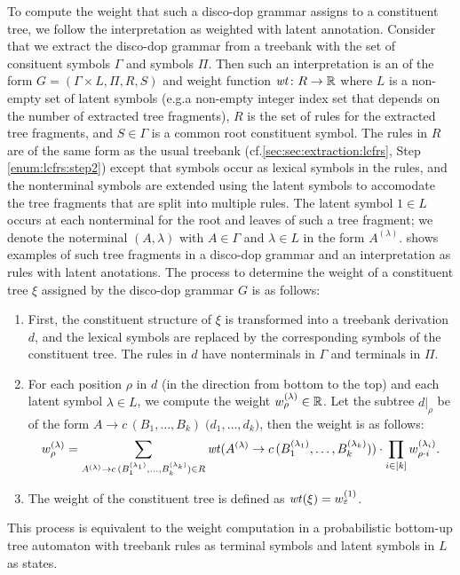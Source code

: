 \documentclass[../../document.tex]{subfiles}
\begin{document}
    To compute the weight that such a disco-dop grammar assigns to a constituent tree, we follow the interpretation as weighted  with latent annotation.
    Consider that we extract the disco-dop grammar from a treebank with the set of consituent symbols \(\varGamma\) and  symbols \(\varPi\).
    Then such an interpretation is an  of the form \(G = (\varGamma \times L, \varPi, R, S)\) and weight function \(\mathit{wt}\colon R \to \mathbb{R}\)  where \(L\) is a non-empty set of latent symbols (e.g.\@ a non-empty integer index set that depends on the number of extracted tree fragments), \(R\) is the set of rules for the extracted tree fragments, and \(S \in \varGamma\) is a common root constituent symbol.
    The rules in \(R\) are of the same form as the usual treebank  (cf.\@ \cref{sec:sec:extraction:lcfrs}, Step \ref{enum:lcfrs:step2}) except that  symbols occur as lexical symbols in the rules, and the nonterminal symbols are extended using the latent symbols to accomodate the tree fragments that are split into multiple rules.
    The latent symbol \(1 \in L\) occurs at each nonterminal for the root and leaves of such a tree fragment; we denote the noterminal \((A, \lambda)\) with \(A\in \varGamma\) and \(\lambda \in L\) in the form \(A^{(\lambda)}\).
     shows examples of such tree fragments in a disco-dop grammar and an interpretation as  rules with latent anotations.
    The process to determine the weight of a constituent tree \(\xi\) assigned by the disco-dop grammar \(G\) is as follows:
    \begin{enumerate}
        \item First, the constituent structure of \(\xi\) is transformed into a treebank  derivation \(d\), and the lexical symbols are replaced by the corresponding  symbols of the constituent tree. The rules in \(d\) have nonterminals in \(\varGamma\) and terminals in \(\varPi\).
        \item For each position \(\rho\) in \(d\) (in the direction from bottom to the top) and each latent symbol \(\lambda \in L\), we compute the weight \(w_\rho^{(\lambda)} \in \mathbb{R}\). Let the subtree \(d|_\rho\) be of the form \(A \to c\,(B_1, \ldots, B_k)\;\big(d_1, \ldots, d_k)\), then the weight is as follows:
            \[
                w_\rho^{(\lambda)} = \sum_{A^{(\lambda)} \to c\,(B_1^{(\lambda_1)}, \ldots, B_k^{(\lambda_k)}) \in R} \mathit{wt}(A^{(\lambda)} \to c\,(B_1^{(\lambda_1)}, \ldots, B_k^{(\lambda_k)})) \cdot \prod_{i \in [k]} w_{\rho\cdot i}^{(\lambda_i)} \text{.}
            \]
        \item The weight of the constituent tree is defined as \(\mathit{wt}(\xi) = w_\varepsilon^{(1)}\).
    \end{enumerate}
    This process is equivalent to the weight computation in a probabilistic bottom-up tree automaton with treebank  rules as terminal symbols and latent symbols in \(L\) as states.
    
\end{document}
